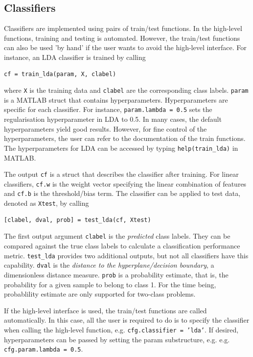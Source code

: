 \documentclass[utf8]{frontiersSCNS} %
\newcommand{\ttt}[1]{\texttt{#1}}
\begin{document}
\subsection{Classifiers}\label{sec:classifiers}

Classifiers are implemented using pairs of train/test functions. In the high-level functions, training and testing is automated. However, the train/test functions can also be used 'by hand' if the user wants to avoid the high-level interface. For instance, an LDA classifier is trained by calling

\begin{verbatim}
cf = train_lda(param, X, clabel)
\end{verbatim}

where \ttt{X} is the training data and \ttt{clabel} are the corresponding class labels. \ttt{param} is a MATLAB struct that contains hyperparameters. Hyperparameters are specific for each classifier. For instance, \ttt{param.lambda = 0.5} sets the regularisation hyperparameter in LDA to 0.5. In many cases, the default hyperparameters yield good results. However, for fine control of the hyperparameters, the user can refer to the documentation of the train functions. The hyperparameters for LDA can be accessed by typing \ttt{help(train\_lda)} in MATLAB. 

The output \ttt{cf} is a struct that describes the classifier after training. For linear classifiers, \ttt{cf.w} is the weight vector specifying the linear combination of features and \ttt{cf.b} is the threshold/bias term. The classifier can be applied to test data, denoted as \ttt{Xtest}, by calling

\begin{verbatim}
[clabel, dval, prob] = test_lda(cf, Xtest)
\end{verbatim}

The first output argument \ttt{clabel} is the \textit{predicted} class labels. They can be compared against the true class labels to calculate a classification performance metric. \ttt{test\_lda} provides two additional outputs, but not all classifiers have this capability. \ttt{dval} is the \textit{distance to the hyperplane/decision boundary}, a dimensionless distance measure. \ttt{prob} is a probability estimate, that is, the probability for a given sample to belong to class 1. For the time being, probablility estimate are only supported for two-class problems.

If the high-level interface is used, the train/test functions are called  automatically. In this case, all the user is required to do is to specify the classifier when calling the high-level function, e.g. \ttt{cfg.classifier = 'lda'}. If desired, hyperparameters can be passed by setting the param substructure, e.g.  e.g. \ttt{cfg.param.lambda = 0.5}.
\end{document}
